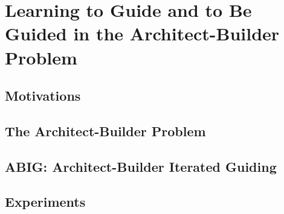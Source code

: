 \chapter{Learning to Guide and to Be Guided in the Architect-Builder Problem}

\section{Motivations}
\section{The Architect-Builder Problem}
\section{ABIG: Architect-Builder Iterated Guiding}
\section{Experiments}
